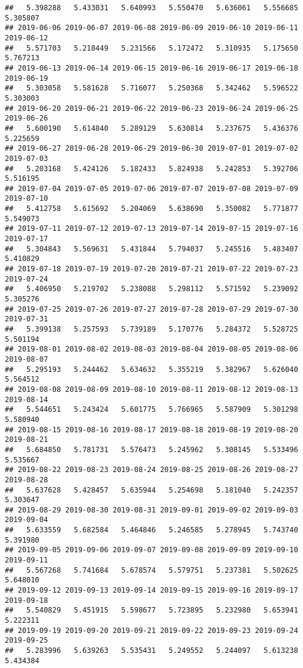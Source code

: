 \documentclass[
]{article}
\begin{document}
\begin{verbatim}
##   5.398288   5.433031   5.640993   5.550470   5.636061   5.556685   5.305807 
## 2019-06-06 2019-06-07 2019-06-08 2019-06-09 2019-06-10 2019-06-11 2019-06-12 
##   5.571703   5.218449   5.231566   5.172472   5.310935   5.175650   5.767213 
## 2019-06-13 2019-06-14 2019-06-15 2019-06-16 2019-06-17 2019-06-18 2019-06-19 
##   5.303058   5.581628   5.716077   5.250368   5.342462   5.596522   5.303003 
## 2019-06-20 2019-06-21 2019-06-22 2019-06-23 2019-06-24 2019-06-25 2019-06-26 
##   5.600190   5.614840   5.289129   5.630814   5.237675   5.436376   5.225659 
## 2019-06-27 2019-06-28 2019-06-29 2019-06-30 2019-07-01 2019-07-02 2019-07-03 
##   5.203168   5.424126   5.182433   5.824938   5.242853   5.392706   5.516195 
## 2019-07-04 2019-07-05 2019-07-06 2019-07-07 2019-07-08 2019-07-09 2019-07-10 
##   5.412758   5.615692   5.204069   5.638690   5.350082   5.771877   5.549073 
## 2019-07-11 2019-07-12 2019-07-13 2019-07-14 2019-07-15 2019-07-16 2019-07-17 
##   5.304843   5.569631   5.431844   5.794037   5.245516   5.483407   5.410829 
## 2019-07-18 2019-07-19 2019-07-20 2019-07-21 2019-07-22 2019-07-23 2019-07-24 
##   5.406950   5.219702   5.238088   5.298112   5.571592   5.239092   5.305276 
## 2019-07-25 2019-07-26 2019-07-27 2019-07-28 2019-07-29 2019-07-30 2019-07-31 
##   5.399138   5.257593   5.739189   5.170776   5.284372   5.528725   5.501194 
## 2019-08-01 2019-08-02 2019-08-03 2019-08-04 2019-08-05 2019-08-06 2019-08-07 
##   5.295193   5.244462   5.634632   5.355219   5.382967   5.626040   5.564512 
## 2019-08-08 2019-08-09 2019-08-10 2019-08-11 2019-08-12 2019-08-13 2019-08-14 
##   5.544651   5.243424   5.601775   5.766965   5.587909   5.301298   5.580940 
## 2019-08-15 2019-08-16 2019-08-17 2019-08-18 2019-08-19 2019-08-20 2019-08-21 
##   5.684850   5.781731   5.576473   5.245962   5.308145   5.533496   5.535667 
## 2019-08-22 2019-08-23 2019-08-24 2019-08-25 2019-08-26 2019-08-27 2019-08-28 
##   5.637628   5.428457   5.635944   5.254698   5.181040   5.242357   5.303647 
## 2019-08-29 2019-08-30 2019-08-31 2019-09-01 2019-09-02 2019-09-03 2019-09-04 
##   5.633559   5.682584   5.464846   5.246585   5.278945   5.743740   5.391980 
## 2019-09-05 2019-09-06 2019-09-07 2019-09-08 2019-09-09 2019-09-10 2019-09-11 
##   5.567268   5.741684   5.678574   5.579751   5.237381   5.502625   5.648010 
## 2019-09-12 2019-09-13 2019-09-14 2019-09-15 2019-09-16 2019-09-17 2019-09-18 
##   5.540829   5.451915   5.598677   5.723895   5.232980   5.653941   5.222311 
## 2019-09-19 2019-09-20 2019-09-21 2019-09-22 2019-09-23 2019-09-24 2019-09-25 
##   5.283996   5.639263   5.535431   5.249552   5.244097   5.613238   5.434384 

\end{verbatim}
\end{document}
